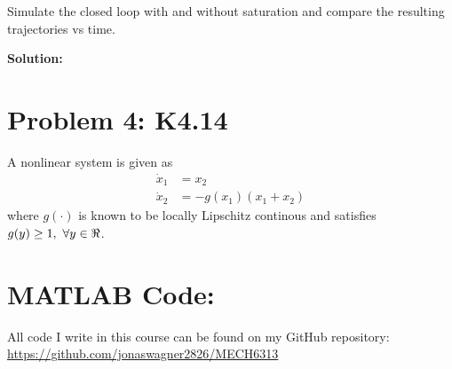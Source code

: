 \documentclass[letter]{article}
\begin{document}
Simulate the closed loop with and without saturation and compare the resulting trajectories vs time.

\textbf{Solution:}














\newpage
\section{Problem 4: K4.14}
A nonlinear system is given as
\begin{equation}
	\begin{aligned}
		\dot{x}_1 &= x_2\\
		\dot{x}_2 &= -g(x_1) (x_1 + x_2)
	\end{aligned}
\end{equation}
where $g(\cdot)$ is known to be locally Lipschitz continous and satisfies $g(y) \geq 1, \ \forall y \in \real$.







\newpage
\appendix
\section{MATLAB Code:}\label{apx:matlab}
All code I write in this course can be found on my GitHub repository:\\
\href{https://github.com/jonaswagner2826/MECH6313}{https://github.com/jonaswagner2826/MECH6313}
%
\end{document}
